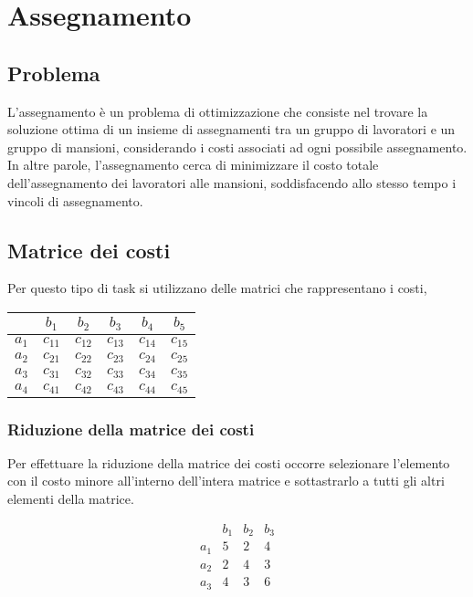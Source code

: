 \chapter{Assegnamento}

\section{Problema}
L'assegnamento \`e un problema di ottimizzazione che consiste nel trovare la soluzione ottima di un insieme di assegnamenti tra un gruppo di lavoratori e un gruppo di mansioni, considerando i costi associati ad ogni possibile assegnamento. In altre parole, l'assegnamento cerca di minimizzare il costo totale dell'assegnamento dei lavoratori alle mansioni, soddisfacendo allo stesso tempo i vincoli di assegnamento.

\section{Matrice dei costi}
Per questo tipo di task si utilizzano delle matrici che rappresentano i costi,

\begin{center}
  \begin{tabular}[t]{l|c|c|c|c|c}
        & $b_1$    & $b_2$    & $b_3$    & $b_4$    & $b_5$     \\
  \hline
  $a_1$ & $c_{11}$ & $c_{12}$ & $c_{13}$ & $c_{14}$ & $c_{15}$  \\
  $a_2$ & $c_{21}$ & $c_{22}$ & $c_{23}$ & $c_{24}$ & $c_{25}$  \\
  $a_3$ & $c_{31}$ & $c_{32}$ & $c_{33}$ & $c_{34}$ & $c_{35}$  \\
  $a_4$ & $c_{41}$ & $c_{42}$ & $c_{43}$ & $c_{44}$ & $c_{45}$  \\
  \end{tabular}
\end{center}

\subsection{Riduzione della matrice dei costi}
Per effettuare la riduzione della matrice dei costi occorre selezionare l'elemento
con il costo minore all'interno dell'intera matrice e sottastrarlo a tutti gli altri elementi della matrice.

\[
  \begin{array}{cccc}
        & b_1 & b_2 & b_3 \\
    a_1 & 5   & 2   & 4   \\
    a_2 & 2   & 4   & 3   \\
    a_3 & 4   & 3   & 6   \\
  \end{array}
\]

